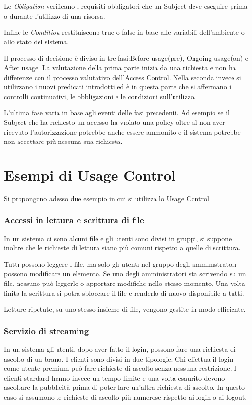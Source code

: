 Le \emph{Obligation} verificano i requisiti obbligatori che un Subject deve eseguire prima o durante l'utilizzo di una risorsa.\par
Infine le \emph{Condition} restituiscono true o false in base alle variabili dell'ambiente o allo stato del sistema.\par
Il processo di decisione è diviso in tre fasi\cite{SurveyUsageControl}:Before usage(pre), Ongoing usage(on) e After usage.
La valutazione della prima parte inizia da una richiesta e non ha differenze con il processo valutativo dell'Access Control.
Nella seconda invece si utilizzano i nuovi predicati introdotti ed è in questa parte che si affermano i controlli continuativi,
le obbligazioni e le condizioni sull'utilizzo.\par
L'ultima fase varia in base agli eventi delle fasi precedenti. Ad esempio se il Subject che ha richiesto un accesso ha violato
una policy oltre al non aver ricevuto l'autorizzazione potrebbe anche essere ammonito e il sistema potrebbe non accettare più
nessuna sua richiesta.

\section{Esempi di Usage Control}
\label{subs:es_UC}
Si propongono adesso due esempio in cui si utilizza lo Usage Control
\subsubsection*{Accessi in lettura e scrittura di file}
\label{subs:Accessi in lettura e scrittura di file}
In un sistema ci sono alcuni file e gli utenti sono divisi in gruppi, si suppone inoltre che le richieste di lettura
siano più comuni rispetto a quelle di scrittura.\par Tutti possono leggere i file, ma solo
gli utenti nel gruppo degli amministratori possono modificare un elemento. Se uno degli amministratori sta scrivendo
su un file, nessuno può leggerlo o apportare modifiche nello stesso momento. Una volta finita la scrittura si potrà sbloccare
il file e renderlo di nuovo disponibile a tutti.\par
Letture ripetute, su uno stesso insieme di file, vengono gestite in modo efficiente.
\subsubsection{Servizio di streaming}
\label{subs:Servizio di streaming}
In un sistema gli utenti, dopo aver fatto il login, possono fare una richiesta di ascolto di un brano. I clienti
sono divisi in due tipologie. Chi effettua il login come utente premium può fare richieste di ascolto senza nessuna restrizione.
I clienti stardard hanno invece un tempo limite e una volta esaurito devono ascoltare la pubblicità prima di poter fare
un'altra richiesta di ascolto. In questo caso si assumono le richieste di ascolto più numerose rispetto ai login o ai logout.
